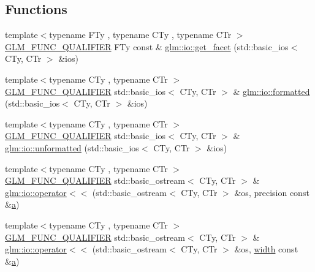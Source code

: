\subsection*{Functions}
\begin{DoxyCompactItemize}
\item 
{\footnotesize template$<$typename F\+Ty , typename C\+Ty , typename C\+Tr $>$ }\\\mbox{\hyperlink{setup_8hpp_a33fdea6f91c5f834105f7415e2a64407}{G\+L\+M\+\_\+\+F\+U\+N\+C\+\_\+\+Q\+U\+A\+L\+I\+F\+I\+ER}} F\+Ty const  \& \mbox{\hyperlink{namespaceglm_1_1io_a9e8927cf032254b0eee4ec650286e1f9}{glm\+::io\+::get\+\_\+facet}} (std\+::basic\+\_\+ios$<$ C\+Ty, C\+Tr $>$ \&ios)
\item 
{\footnotesize template$<$typename C\+Ty , typename C\+Tr $>$ }\\\mbox{\hyperlink{setup_8hpp_a33fdea6f91c5f834105f7415e2a64407}{G\+L\+M\+\_\+\+F\+U\+N\+C\+\_\+\+Q\+U\+A\+L\+I\+F\+I\+ER}} std\+::basic\+\_\+ios$<$ C\+Ty, C\+Tr $>$ \& \mbox{\hyperlink{namespaceglm_1_1io_aa31ec433f6039e5bd35f0f58b37bef83}{glm\+::io\+::formatted}} (std\+::basic\+\_\+ios$<$ C\+Ty, C\+Tr $>$ \&ios)
\item 
{\footnotesize template$<$typename C\+Ty , typename C\+Tr $>$ }\\\mbox{\hyperlink{setup_8hpp_a33fdea6f91c5f834105f7415e2a64407}{G\+L\+M\+\_\+\+F\+U\+N\+C\+\_\+\+Q\+U\+A\+L\+I\+F\+I\+ER}} std\+::basic\+\_\+ios$<$ C\+Ty, C\+Tr $>$ \& \mbox{\hyperlink{namespaceglm_1_1io_a8f950faa7ad67cac1287beaf896a8bb6}{glm\+::io\+::unformatted}} (std\+::basic\+\_\+ios$<$ C\+Ty, C\+Tr $>$ \&ios)
\item 
{\footnotesize template$<$typename C\+Ty , typename C\+Tr $>$ }\\\mbox{\hyperlink{setup_8hpp_a33fdea6f91c5f834105f7415e2a64407}{G\+L\+M\+\_\+\+F\+U\+N\+C\+\_\+\+Q\+U\+A\+L\+I\+F\+I\+ER}} std\+::basic\+\_\+ostream$<$ C\+Ty, C\+Tr $>$ \& \mbox{\hyperlink{namespaceglm_1_1io_ac52a8c5f8ea189f5bae2e5b8e382675f}{glm\+::io\+::operator$<$$<$}} (std\+::basic\+\_\+ostream$<$ C\+Ty, C\+Tr $>$ \&os, precision const \&\mbox{\hyperlink{glad_8h_ac8729153468b5dcf13f971b21d84d4e5}{a}})
\item 
{\footnotesize template$<$typename C\+Ty , typename C\+Tr $>$ }\\\mbox{\hyperlink{setup_8hpp_a33fdea6f91c5f834105f7415e2a64407}{G\+L\+M\+\_\+\+F\+U\+N\+C\+\_\+\+Q\+U\+A\+L\+I\+F\+I\+ER}} std\+::basic\+\_\+ostream$<$ C\+Ty, C\+Tr $>$ \& \mbox{\hyperlink{namespaceglm_1_1io_ac4783e4e3b0384619625d5d2d00c27b8}{glm\+::io\+::operator$<$$<$}} (std\+::basic\+\_\+ostream$<$ C\+Ty, C\+Tr $>$ \&os, \mbox{\hyperlink{glad_8h_a09012ea95ebbbe1c032db7c68b54291e}{width}} const \&\mbox{\hyperlink{glad_8h_ac8729153468b5dcf13f971b21d84d4e5}{a}})

\end{DoxyCompactItemize}
